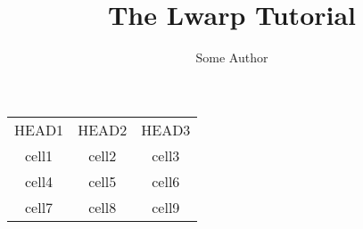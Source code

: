 \documentclass{book}
\title{The Lwarp Tutorial}
\author{Some Author}
\begin{document}


\begin{center}
  \begin{tabular}{ c c c }
    HEAD1 & HEAD2 & HEAD3 \\ 
    cell1 & cell2 & cell3 \\ 
    cell4 & cell5 & cell6 \\  
    cell7 & cell8 & cell9    
  \end{tabular}
\end{center}
\end{document}
